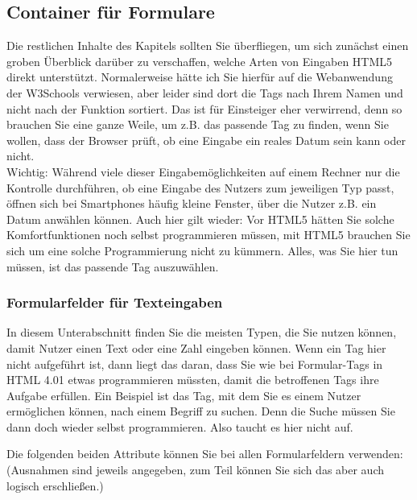 \subsection{Container für Formulare}

Die restlichen Inhalte des Kapitels sollten Sie überfliegen, um sich zunächst einen groben Überblick darüber zu verschaffen, welche Arten von Eingaben HTML5 direkt unterstützt. Normalerweise hätte ich Sie hierfür auf die Webanwendung der W3Schools verwiesen, aber leider sind dort die Tags nach Ihrem Namen und nicht nach der Funktion sortiert. Das ist für Einsteiger eher verwirrend, denn so brauchen Sie eine ganze Weile, um z.B. das passende Tag zu finden, wenn Sie wollen, dass der Browser prüft, ob eine Eingabe ein reales Datum sein kann oder nicht.\\

Wichtig: Während viele dieser Eingabemöglichkeiten auf einem Rechner nur die Kontrolle durchführen, ob eine Eingabe des Nutzers zum jeweiligen Typ passt, öffnen sich bei Smartphones häufig kleine Fenster, über die Nutzer z.B. ein Datum anwählen können. Auch hier gilt wieder: Vor HTML5 hätten Sie solche Komfortfunktionen noch selbst programmieren müssen, mit HTML5 brauchen Sie sich um eine solche Programmierung nicht zu kümmern. Alles, was Sie hier tun müssen, ist das passende Tag auszuwählen.

\subsubsection{Formularfelder für Texteingaben}

In diesem Unterabschnitt finden Sie die meisten Typen, die Sie nutzen können, damit Nutzer einen Text oder eine Zahl eingeben können. Wenn ein Tag hier nicht aufgeführt ist, dann liegt das daran, dass Sie wie bei Formular-Tags in HTML 4.01 etwas programmieren müssten, damit die betroffenen Tags ihre Aufgabe erfüllen. Ein Beispiel ist das Tag, mit dem Sie es einem Nutzer ermöglichen können, nach einem Begriff zu suchen. Denn die Suche müssen Sie dann doch wieder selbst programmieren. Also taucht es hier nicht auf.

Die folgenden beiden Attribute können Sie bei allen Formularfeldern verwenden: (Ausnahmen sind jeweils angegeben, zum Teil können Sie sich das aber auch logisch erschließen.)


